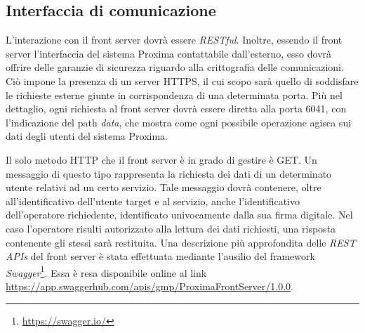 \documentclass[a4paper,12pt]{report}
\begin{document}
\subsection{Interfaccia di comunicazione} \label{frontserver-api}
L'interazione con il front server dovrà essere \emph{RESTful}. Inoltre, essendo il front server l'interfaccia del sistema Proxima contattabile dall'esterno, esso dovrà offrire delle garanzie di sicurezza riguardo alla crittografia delle comunicazioni. Ciò impone la presenza di un server HTTPS, il cui scopo sarà quello di soddisfare le richieste esterne giunte in corrispondenza di una determinata porta. Più nel dettaglio, ogni richiesta al front server dovrà essere diretta alla porta 6041, con l'indicazione del path \emph{data}, che mostra come ogni possibile operazione agisca sui dati degli utenti del sistema Proxima. 

Il solo metodo HTTP che il front server è in grado di gestire è GET. Un messaggio di questo tipo rappresenta la richiesta dei dati di un determinato utente relativi ad un certo servizio. Tale messaggio dovrà contenere, oltre all'identificativo dell'utente target e al servizio, anche l'identificativo dell'operatore richiedente, identificato univocamente dalla sua firma digitale. Nel caso l'operatore risulti autorizzato alla lettura dei dati richiesti, una risposta contenente gli stessi sarà restituita. Una descrizione più approfondita delle \emph{REST APIs} del front server è stata effettuata mediante l'ausilio del framework \emph{Swagger}\footnote{\url{https://swagger.io/}}. Essa è resa disponibile online al link \url{https://app.swaggerhub.com/apis/gmp/ProximaFrontServer/1.0.0}.
\end{document}
